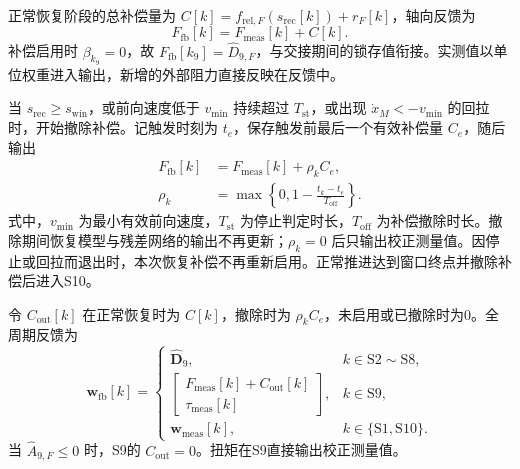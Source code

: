 \documentclass{JQR_LaTeX_Template-0507/JQRnew}
\begin{document}
正常恢复阶段的总补偿量为 $C[k]=f_{\mathrm{rel},F}(s_{\mathrm{rec}}[k])+r_F[k]$，轴向反馈为
\begin{equation}
\label{eq:active-output}
F_{\mathrm{fb}}[k]=F_{\mathrm{meas}}[k]+C[k].
\end{equation}
补偿启用时 $\beta_{k_9}=0$，故 $F_{\mathrm{fb}}[k_9]=\widehat D_{9,F}$，与交接期间的锁存值衔接。实测值以单位权重进入输出，新增的外部阻力直接反映在反馈中。

当 $s_{\mathrm{rec}}\ge s_{\mathrm{win}}$，或前向速度低于 $v_{\min}$ 持续超过 $T_{\mathrm{st}}$，或出现 $\dot x_M<-v_{\min}$ 的回拉时，开始撤除补偿。记触发时刻为 $t_e$，保存触发前最后一个有效补偿量 $C_e$，随后输出
\begin{equation}
\label{eq:withdrawal}
\begin{aligned}
F_{\mathrm{fb}}[k]&=F_{\mathrm{meas}}[k]+\rho_kC_e,\\
\rho_k&=\max\!\left\{0,1-\frac{t_k-t_e}{T_{\mathrm{off}}}\right\}.
\end{aligned}
\end{equation}
式中，$v_{\min}$ 为最小有效前向速度，$T_{\mathrm{st}}$ 为停止判定时长，$T_{\mathrm{off}}$ 为补偿撤除时长。撤除期间恢复模型与残差网络的输出不再更新；$\rho_k=0$ 后只输出校正测量值。因停止或回拉而退出时，本次恢复补偿不再重新启用。正常推进达到窗口终点并撤除补偿后进入S10。

令 $C_{\mathrm{out}}[k]$ 在正常恢复时为 $C[k]$，撤除时为 $\rho_kC_e$，未启用或已撤除时为0。全周期反馈为
\begin{equation}
\label{eq:phase-output}
\bm w_{\mathrm{fb}}[k]=
\begin{cases}
\widehat{\bm D}_9,&k\in\mathrm{S2}\sim\mathrm{S8},\\
\begin{bmatrix}F_{\mathrm{meas}}[k]+C_{\mathrm{out}}[k]\\
\tau_{\mathrm{meas}}[k]\end{bmatrix},&k\in\mathrm{S9},\\
\bm w_{\mathrm{meas}}[k],&k\in\{\mathrm{S1},\mathrm{S10}\}.
\end{cases}
\end{equation}
当 $\widehat A_{9,F}\le0$ 时，S9的 $C_{\mathrm{out}}=0$。扭矩在S9直接输出校正测量值。
\end{document}
